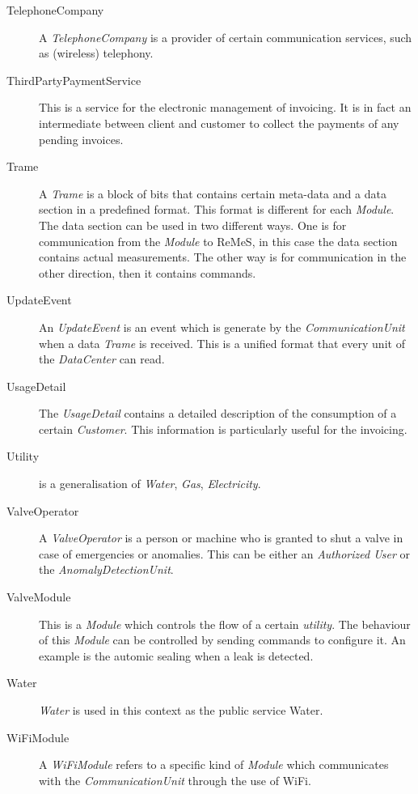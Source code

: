 \begin{description}
\item[TelephoneCompany] A \emph{TelephoneCompany} is a provider of certain
communication services, such as (wireless) telephony.

\item[ThirdPartyPaymentService] This is a service for the electronic management
of invoicing. It is in fact an intermediate between client and customer to
collect the payments of any pending invoices.

\item[Trame] A \emph{Trame} is a block of bits that contains certain meta-data
and a data section in a predefined format. This format is different for each
\emph{Module}. The data section can be used in two different ways. One is for
communication from the \emph{Module} to ReMeS, in this case the data section
contains actual measurements. The other way is for communication in the other
direction, then it contains commands.

\item[UpdateEvent] An \emph{UpdateEvent} is an event which is generate by
the \emph{CommunicationUnit} when a data \emph{Trame} is received. This is a
unified format that every unit of the \emph{DataCenter} can read.

\item[UsageDetail] The \emph{UsageDetail} contains a detailed description of the
consumption of a certain \emph{Customer}. This information is particularly
useful for the invoicing.

\item[Utility] is a generalisation of \emph{Water}, \emph{Gas},
\emph{Electricity}.

\item[ValveOperator] A \emph{ValveOperator} is a person or machine who is
granted to shut a valve in case of emergencies or anomalies. This can be either
an \emph{Authorized User} or the \emph{AnomalyDetectionUnit}.

\item[ValveModule] This is a \emph{Module} which controls the flow of a certain
\emph{utility}. The behaviour of this \emph{Module} can be controlled by sending
commands to configure it. An example is the automic sealing when a leak is
detected.

\item[Water] \emph{Water} is used in this context as the public service Water.

\item[WiFiModule] A \emph{WiFiModule} refers to a specific kind of \emph{Module}
which communicates with the \emph{CommunicationUnit} through the use of WiFi.

\end{description}